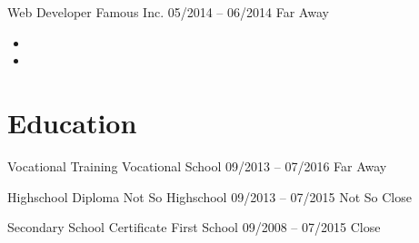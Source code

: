 \documentclass[9pt]{saiba-cv}
\begin{document}
{  \entry
    {Web Developer}
    {Famous Inc.}
    {05/2014 -- 06/2014}
    {Far Away}
    {\begin{itemize}[leftmargin=1em,topsep=0em]
      \item \lorem
      \item \lorem
    \end{itemize}}


  \section*{Education}
  \entry
    {Vocational Training}
    {Vocational School}
    {09/2013 -- 07/2016}
    {Far Away}
    {\lorem}

  \entry
    {Highschool Diploma}
    {Not So Highschool}
    {09/2013 -- 07/2015}
    {Not So Close}
    {\lorem}

  \entry
    {Secondary School Certificate}
    {First School}
    {09/2008 -- 07/2015}
    {Close}
    {\lorem}
}
\end{document}
